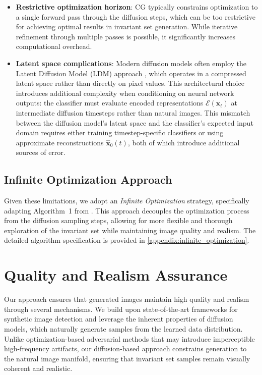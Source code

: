 \documentclass[licencjacka,en]{pracamgr}
\begin{document}
\begin{itemize}
  \item \textbf{Restrictive optimization horizon}: CG typically constrains optimization to a single forward pass through the diffusion steps, which can be too restrictive for achieving optimal results in invariant set generation. While iterative refinement through multiple passes is possible, it significantly increases computational overhead.
  
  \item \textbf{Latent space complications}: Modern diffusion models often employ the Latent Diffusion Model (LDM) approach \citep{rombach2022highresolutionimagesynthesislatent}, which operates in a compressed latent space rather than directly on pixel values. This architectural choice introduces additional complexity when conditioning on neural network outputs: the classifier must evaluate encoded representations $\mathcal{E}(\mathbf{x}_t)$ at intermediate diffusion timesteps rather than natural images. This mismatch between the diffusion model's latent space and the classifier's expected input domain requires either training timestep-specific classifiers or using approximate reconstructions $\hat{\mathbf{x}}_0(t)$, both of which introduce additional sources of error.
\end{itemize}

\subsection{Infinite Optimization Approach}

Given these limitations, we adopt an \textit{Infinite Optimization} strategy, specifically adapting Algorithm~1 from \citep{augustin2024digindiffusionguidanceinvestigating}. This approach decouples the optimization process from the diffusion sampling steps, allowing for more flexible and thorough exploration of the invariant set while maintaining image quality and realism. The detailed algorithm specification is provided in \cref{appendix:infinite_optimization}.

\section{Quality and Realism Assurance}\label{method:quality_realism}

Our approach ensures that generated images maintain high quality and realism through several mechanisms. We build upon state-of-the-art frameworks for synthetic image detection and leverage the inherent properties of diffusion models, which naturally generate samples from the learned data distribution. Unlike optimization-based adversarial methods that may introduce imperceptible high-frequency artifacts, our diffusion-based approach constrains generation to the natural image manifold, ensuring that invariant set samples remain visually coherent and realistic.
\end{document}
